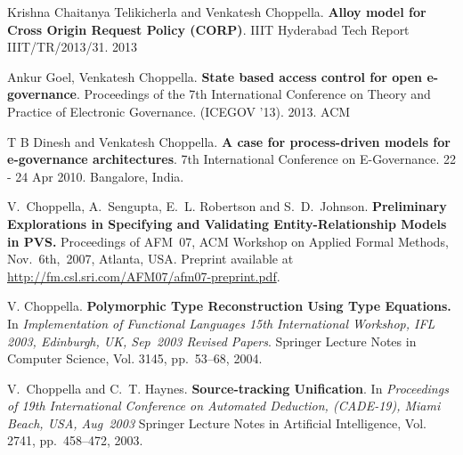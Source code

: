 \documentclass[11pt,margin,line]{res}
\begin{document}
\begin{resume}
Krishna Chaitanya Telikicherla and Venkatesh Choppella.
{\bf Alloy model for {C}ross {O}rigin {R}equest {P}olicy
  (CORP)}.  IIIT Hyderabad Tech Report IIIT/TR/2013/31.  2013



Ankur Goel, Venkatesh Choppella.  {\bf State based access
  control for open e-governance}.  Proceedings of the 7th
International Conference on Theory and Practice of
Electronic Governance.  (ICEGOV '13).  2013.  ACM

T B Dinesh and Venkatesh Choppella.  {\bf A case for
  process-driven models for e-governance architectures}.
7th International Conference on E-Governance.  22 - 24
Apr 2010.  Bangalore, India.  

V.~Choppella, A.~Sengupta, E.~L. Robertson and
S.~D.~Johnson.  {\bf Preliminary Explorations in Specifying
  and Validating Entity-Relationship Models in PVS.}
Proceedings of AFM~07, ACM Workshop on Applied Formal
Methods, Nov.~6th,~2007, Atlanta, USA.  Preprint available
at \url{http://fm.csl.sri.com/AFM07/afm07-preprint.pdf}.

V. Choppella.  {\bf Polymorphic Type Reconstruction Using
Type Equations.}  In {\em {Implementation of Functional
Languages 15th International Workshop, IFL 2003, Edinburgh,
UK, Sep~2003 Revised Papers}}.  Springer Lecture Notes in
Computer Science, Vol. 3145, pp.~53--68, 2004.

V.~Choppella and C.~T. Haynes. {\bf Source-tracking
  Unification}.  In {\em {Proceedings of 19th International
    Conference on Automated Deduction, (CADE-19), Miami
    Beach, USA, Aug~2003}} Springer Lecture Notes in
Artificial Intelligence, Vol. 2741, pp.~458--472, 2003.




\vspace{2em}



\end{resume}
\end{document}
